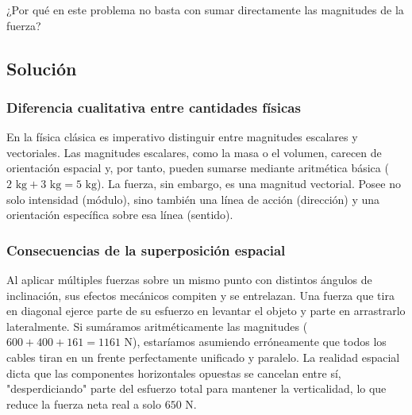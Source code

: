 \documentclass[12pt, a4paper]{article}
\begin{document}
\begin{center}
\end{center}
¿Por qué en este problema no basta con sumar directamente las magnitudes de la fuerza?

\subsection*{Solución}

\subsubsection*{Diferencia cualitativa entre cantidades físicas}
En la física clásica es imperativo distinguir entre magnitudes escalares y vectoriales. Las magnitudes escalares, como la masa o el volumen, carecen de orientación espacial y, por tanto, pueden sumarse mediante aritmética básica ($2 \text{ kg} + 3 \text{ kg} = 5 \text{ kg}$). La fuerza, sin embargo, es una magnitud vectorial. Posee no solo intensidad (módulo), sino también una línea de acción (dirección) y una orientación específica sobre esa línea (sentido).

\subsubsection*{Consecuencias de la superposición espacial}
Al aplicar múltiples fuerzas sobre un mismo punto con distintos ángulos de inclinación, sus efectos mecánicos compiten y se entrelazan. Una fuerza que tira en diagonal ejerce parte de su esfuerzo en levantar el objeto y parte en arrastrarlo lateralmente. Si sumáramos aritméticamente las magnitudes ($600 + 400 + 161 = 1161 \text{ N}$), estaríamos asumiendo erróneamente que todos los cables tiran en un frente perfectamente unificado y paralelo. La realidad espacial dicta que las componentes horizontales opuestas se cancelan entre sí, "desperdiciando" parte del esfuerzo total para mantener la verticalidad, lo que reduce la fuerza neta real a solo $650 \text{ N}$.
\end{document}
